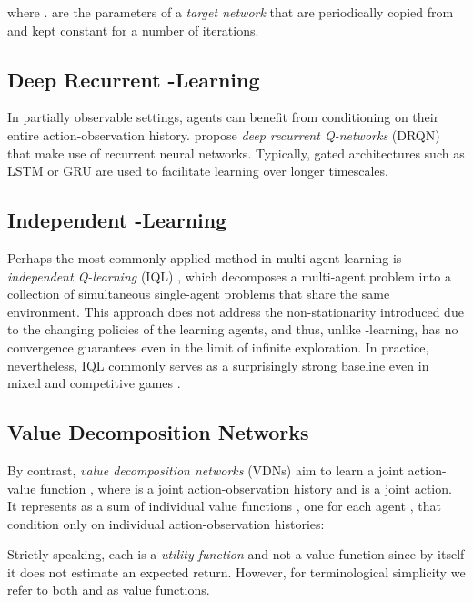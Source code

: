 \documentclass[twoside,11pt]{article}
\renewcommand{\cite}{\citep}
\begin{document}
where .  are the parameters of a \textit{target network} that are periodically copied from  and kept constant for a number of iterations.  

\subsection{Deep Recurrent -Learning}

In partially observable settings, agents can benefit from conditioning on their entire action-observation history. \citet{hausknecht_deep_2015} propose \textit{deep recurrent Q-networks} (DRQN) that make use of recurrent neural networks. Typically, gated architectures such as LSTM \cite{hochreiter_long_1997} or GRU \cite{chung_empirical_2014} are used to facilitate learning over longer timescales.

\subsection{Independent -Learning}

Perhaps the most commonly applied method in multi-agent learning is \textit{independent Q-learning} (IQL) \cite{tan_multi-agent_1993}, which decomposes a multi-agent problem into a collection of simultaneous single-agent problems that share the same environment. This approach does not address the non-stationarity introduced due to the changing policies of the learning agents, and thus, unlike -learning, has no convergence guarantees even in the limit of infinite exploration. In practice, nevertheless, IQL commonly serves as a surprisingly strong baseline even in mixed and competitive games \cite{tampuu_multiagent_2015, leibo_multi-agent_2017}.


\subsection{Value Decomposition Networks}

By contrast, \textit{value decomposition networks} (VDNs) \citep{sunehag_value-decomposition_2017} aim to learn a joint action-value function , where  is a joint action-observation history and  is a joint action.  It represents  as a sum of individual value functions , one for each agent , that condition only on individual action-observation histories:

Strictly speaking, each  is a \textit{utility function} \cite{guestrin_multiagent_2002} and not a value function since by itself it does not estimate an expected return.  However, for terminological simplicity we refer to both  and  as value functions.
\end{document}

